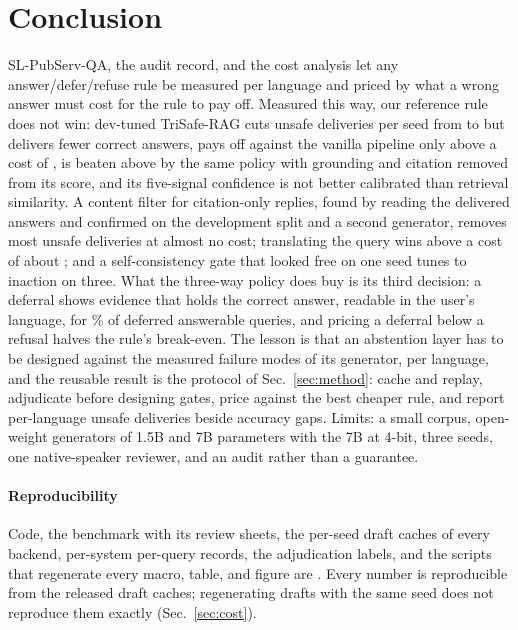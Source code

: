 \section{Conclusion}\label{sec:conclusion}
SL-PubServ-QA, the audit record, and the cost analysis let any answer/defer/refuse rule be measured per language and priced by what a wrong answer must cost for the rule to pay off. Measured this way, our reference rule does not win: dev-tuned TriSafe-RAG cuts unsafe deliveries per seed from \LBoneUnsafe{} to \LTunUnsafe{} but delivers \LTunLostVsBone{} fewer correct answers, pays off against the vanilla pipeline only above a cost of \LTunBreakEven, is beaten above \LCrossTunBthree{} by the same policy with grounding and citation removed from its score, and its five-signal confidence is not better calibrated than retrieval similarity. A content filter for citation-only replies, found by reading the delivered answers and confirmed on the development split and a second generator, removes most unsafe deliveries at almost no cost; translating the query wins above a cost of about \LEsixBreakEvenEmpty; and a self-consistency gate that looked free on one seed tunes to inaction on three. What the three-way policy does buy is its third decision: a deferral shows evidence that holds the correct answer, readable in the user's language, for \LTunDeferVisReadPct\% of deferred answerable queries, and pricing a deferral below a refusal halves the rule's break-even. The lesson is that an abstention layer has to be designed against the measured failure modes of its generator, per language, and the reusable result is the protocol of Sec.~\ref{sec:method}: cache and replay, adjudicate before designing gates, price against the best cheaper rule, and report per-language unsafe deliveries beside accuracy gaps. Limits: a small corpus, open-weight generators of 1.5B and 7B parameters with the 7B at 4-bit, three seeds, one native-speaker reviewer, and an audit rather than a guarantee.

\paragraph{Reproducibility} Code, the benchmark with its review sheets, the per-seed draft caches of every backend, per-system per-query records, the adjudication labels, and the scripts that regenerate every macro, table, and figure are \RepoStatement. Every number is reproducible from the released draft caches; regenerating drafts with the same seed does not reproduce them exactly (Sec.~\ref{sec:cost}).

